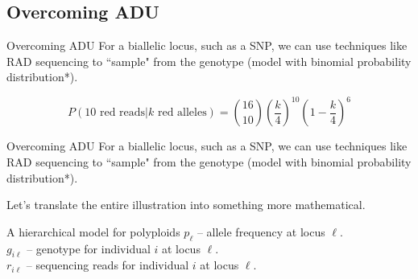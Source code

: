 \documentclass[presentation,sansserif]{beamer}
\begin{document}
\subsection{Overcoming ADU}

\begin{frame}[t]{Overcoming ADU}
	For a biallelic locus, such as a SNP, we can use techniques like RAD sequencing to ``sample" from the genotype (model with binomial probability distribution*).
	\vspace{0.2in}

	\begin{center}
	\end{center}

	\pause
	\begin{equation*}
	P(10 \text{ red reads}|k \text{ red alleles}) = \binom{16}{10}\left(\frac{k}{4}\right)^{10}\left(1-\frac{k}{4}\right)^6
	\end{equation*}

\end{frame}

\begin{frame}[t]{Overcoming ADU}
	For a biallelic locus, such as a SNP, we can use techniques like RAD sequencing to ``sample" from the genotype (model with binomial probability distribution*).
	\vspace{0.2in}

	\begin{center}
	\end{center}

	\vspace{0.1in}
	Let's translate the entire illustration into something more mathematical.
\end{frame}

\begin{frame}[c]{A hierarchical model for polyploids}
	$p_{\ell}$ -- allele frequency at locus $\ell$. \\
	$g_{i \ell}$ -- genotype for individual $i$ at locus $\ell$. \\
	$r_{i \ell}$ -- sequencing reads for individual $i$ at locus $\ell$.
	\vspace{0.1in}
	\begin{center}
	\end{center}
\end{frame}
\end{document}
